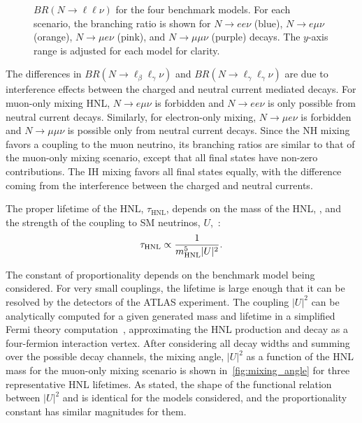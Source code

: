 \begin{figure}[!ht]
    \caption{$BR(N\to \ell\ell\nu)$ for the four benchmark models. For each scenario, the branching ratio is shown for $N\to ee\nu$ (blue), $N\to e\mu\nu$ (orange),  $N\to \mu e\nu$ (pink), and $N\to\mu\mu\nu$ (purple) decays. The $y$-axis range is adjusted for each model for clarity.~\cite{Trischuk:2806047}}
    \label{fig:branching_ratio}
\end{figure}

The differences in $BR(N\to\ell_\beta\ell_\gamma\nu)$ and $BR(N\to\ell_\gamma\ell_\gamma\nu)$ are due to interference effects between the charged and neutral current mediated decays. For muon-only mixing HNL, $N\to e\mu\nu$ is forbidden and $N\to ee\nu$ is only possible from neutral current decays. Similarly, for electron-only mixing, $N\to \mu e\nu$ is forbidden and $N\to \mu\mu\nu$ is possible only from neutral current decays. Since the NH mixing favors a coupling to the muon neutrino, its branching ratios are similar to that of the muon-only mixing scenario, except that all final states have non-zero contributions. The IH mixing favors all final states equally, with the difference coming from the interference between the charged and neutral currents.

The proper lifetime of the HNL, $\tau_\mathrm{HNL}$, depends on the mass of the HNL, \mhnl, and the strength of the coupling to SM neutrinos, $U$,~\cite{PhysRevD.29.2539}:
\begin{equation}
    \tau_\mathrm{HNL} \propto \frac{1}{m_{\mathrm{HNL}}^5 |U|^2}.
\end{equation}

The constant of proportionality depends on the benchmark model being considered. For very small couplings, the lifetime is large enough that it can be resolved by the detectors of the ATLAS experiment. The coupling $|U|^2$ can be analytically computed for a given generated mass and lifetime in a simplified Fermi theory computation~\cite{Bondarenko2018}, approximating the HNL production and decay as a four-fermion interaction vertex. After considering all decay widths and summing over the possible decay channels, the mixing angle, $|U|^2$ as a function of the HNL mass for the muon-only mixing scenario is shown in~\cref{fig:mixing_angle} for three representative HNL lifetimes. As stated, the shape of the functional relation between $|U|^2$ and \mhnl is identical for the models considered, and the proportionality constant has similar magnitudes for them.

